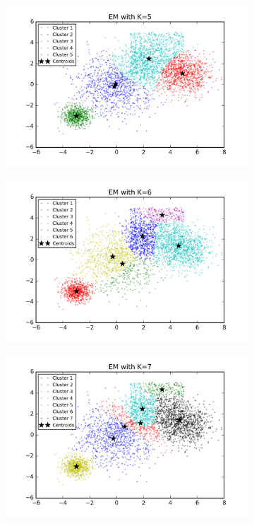 \begin{description}
\begin{description}
\begin{figure}[!h]
\begin{subfigure}[b]{0.475\textwidth}
            \includegraphics[width=\textwidth]{./figures/bigClustering_EM_5.png}
        \end{subfigure}
        \hfill
        \begin{subfigure}[b]{0.475\textwidth}   
            \centering 
            \includegraphics[width=\textwidth]{./figures/bigClustering_EM_6.png}
        \end{subfigure}
        \begin{subfigure}[b]{0.475\textwidth}   
            \centering 
            \includegraphics[width=\textwidth]{./figures/bigClustering_EM_7.png}

\end{subfigure}
\end{figure}
\end{description}
\end{description}
